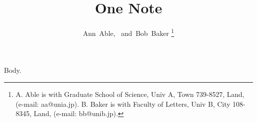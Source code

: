 \documentclass[journal]{IEEEtran}
\begin{document}
\title{One Note}
\author{Ann~Able,~
	and~Bob~Baker
\thanks{
	A. Able is with Graduate School of Science, Univ A, Town 739-8527, Land, (e-mail: aa@unia.jp).
	B. Baker is with Faculty of Letters, Univ B, City 108-8345, Land, (e-mail: bb@unib.jp).
}}
\maketitle
Body.
\end{document}
